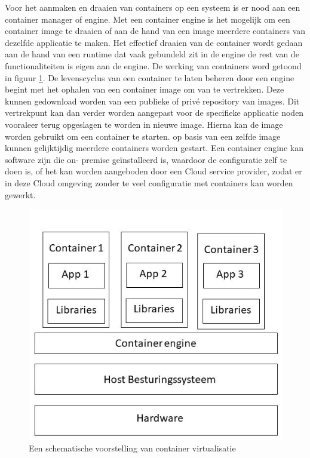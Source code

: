 Voor het aanmaken en draaien van containers op een systeem is er nood aan een container manager of engine. Met een container engine is het mogelijk om een container image te draaien of aan de hand van een image meerdere containers van dezelfde applicatie te maken. Het effectief draaien van de container wordt gedaan aan de hand van een runtime dat vaak gebundeld zit in de engine de rest van de functionaliteiten is eigen aan de engine. De werking van containers word getoond in figuur \ref{fig:Containers}. De levenscyclus van een container te laten beheren door een engine begint met het ophalen van een container image om van te vertrekken. Deze kunnen gedownload worden van een publieke of privé repository van images. Dit vertrekpunt kan dan verder worden aangepast voor de specifieke applicatie noden vooraleer terug opgeslagen te worden in nieuwe image. Hierna kan de image worden gebruikt om een container te starten. op basis van een zelfde image kunnen gelijktijdig meerdere containers worden gestart. Een container engine kan software zijn die on- premise geïnstalleerd is, waardoor de configuratie zelf te doen is, of het kan worden aangeboden door een Cloud service provider, zodat er in deze Cloud omgeving zonder te veel configuratie met containers kan worden gewerkt\autocite{Casalicchio2020}.
\begin{figure}[h]
    \includegraphics[width=\linewidth]{img/container.jpg}
    \caption[Schema container virtualisatie]{Een schematische voorstelling van container virtualisatie}
    \label{fig:Containers}
    \centering
\end{figure}

